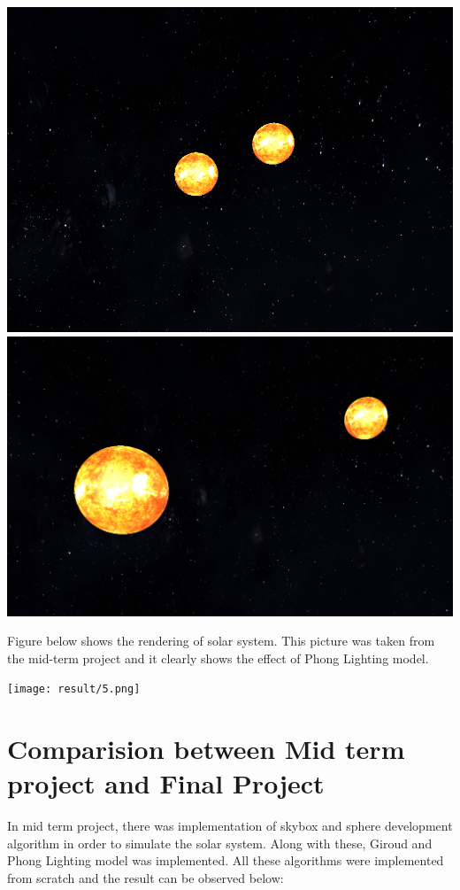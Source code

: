 \documentclass[12pt]{article}
\begin{document}
\begin{center}
	\includegraphics[scale=0.2]{result/bin.png}
	\includegraphics[scale=0.2]{result/bin1.png}
\end{center}


Figure below shows the rendering of solar system. This picture was taken from the mid-term project and it clearly shows the effect of Phong Lighting model.

\begin{center}
	\texttt{[image: result/5.png]}
\end{center}

\clearpage

\section{Comparision between Mid term project and Final Project}
In mid term project, there was implementation of skybox and sphere development algorithm in order to simulate the solar system. Along with these, Giroud and Phong Lighting model was implemented. All these algorithms were implemented from scratch and the result can be observed below:
\end{document}
